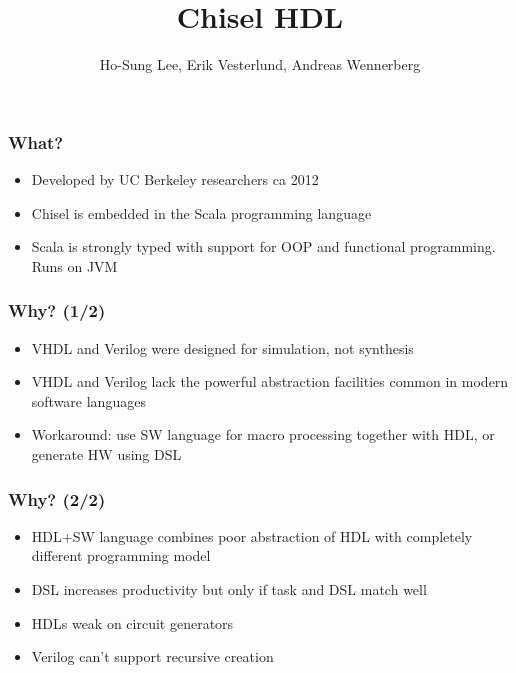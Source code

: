 \documentclass{beamer}
\title{Chisel HDL}
\author{Ho-Sung Lee, Erik Vesterlund, Andreas Wennerberg}
\begin{document}
\begin{frame}
\titlepage
\end{frame}

\begin{frame}
\frametitle{What?}
\begin{itemize}

\item Developed by UC Berkeley researchers ca 2012

\item Chisel is embedded in the Scala programming language

\item Scala is strongly typed with support for OOP and functional programming. Runs on JVM

\end{itemize}
\end{frame}

\begin{frame}
\frametitle{Why? (1/2)}
\begin{itemize}

\item VHDL and Verilog were designed for simulation, not synthesis

\item VHDL and Verilog lack the powerful abstraction facilities common in modern software languages

\item Workaround: use SW language for macro processing together with HDL, or generate HW using DSL

\end{itemize}
\end{frame}

\begin{frame}
\frametitle{Why? (2/2)}
\begin{itemize}

\item HDL+SW language combines poor abstraction of HDL with completely different programming model

\item DSL increases productivity but only if task and DSL match well

\item HDLs weak on circuit generators

\item Verilog can't support recursive creation

\end{itemize}
\end{frame}
\end{document}
